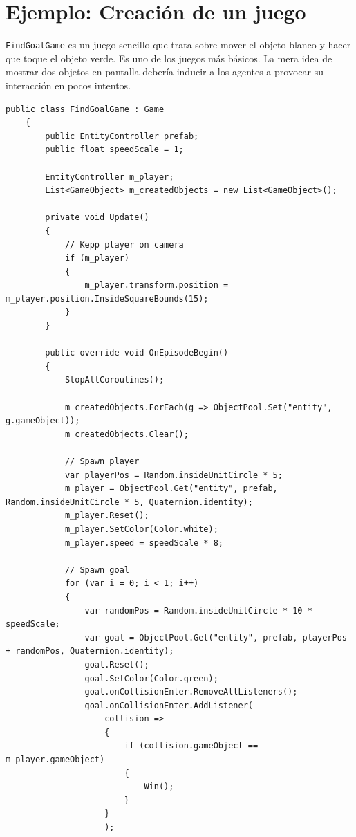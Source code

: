 \section{Ejemplo: Creación de un juego}
 
\lstinline{FindGoalGame} es un juego sencillo que trata sobre mover el objeto blanco y hacer que toque el objeto verde. Es uno de los juegos más básicos. La mera idea de mostrar dos objetos en pantalla debería inducir a los agentes a provocar su interacción en pocos intentos. 
 
\vspace*{1cm}
 
\begin{lstlisting}[caption={Ejemplo de implementación de un juego que trata sobre un objeto de color blanco que debe tocar al objeto verde.}]
    public class FindGoalGame : Game
    {
        public EntityController prefab;
        public float speedScale = 1;
 
        EntityController m_player;
        List<GameObject> m_createdObjects = new List<GameObject>();
 
        private void Update()
        {
            // Kepp player on camera
            if (m_player)
            {
                m_player.transform.position = m_player.position.InsideSquareBounds(15);
            }
        }
 
        public override void OnEpisodeBegin()
        {
            StopAllCoroutines();
 
            m_createdObjects.ForEach(g => ObjectPool.Set("entity", g.gameObject));
            m_createdObjects.Clear();
 
            // Spawn player
            var playerPos = Random.insideUnitCircle * 5;
            m_player = ObjectPool.Get("entity", prefab, Random.insideUnitCircle * 5, Quaternion.identity);
            m_player.Reset();
            m_player.SetColor(Color.white);
            m_player.speed = speedScale * 8;
 
            // Spawn goal
            for (var i = 0; i < 1; i++)
            {
                var randomPos = Random.insideUnitCircle * 10 * speedScale;
                var goal = ObjectPool.Get("entity", prefab, playerPos + randomPos, Quaternion.identity);
                goal.Reset();
                goal.SetColor(Color.green);
                goal.onCollisionEnter.RemoveAllListeners();
                goal.onCollisionEnter.AddListener(
                    collision =>
                    {
                        if (collision.gameObject == m_player.gameObject)
                        {
                            Win();
                        }
                    }
                    );
 

\end{lstlisting}
